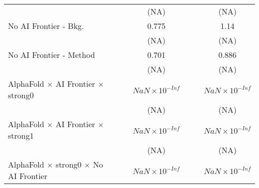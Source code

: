 \begin{tabular}{lcccccc}
                                                                              &                        &                        & (NA)                   &                        &                        & (NA)\\   
   No AI Frontier - Bkg.                                                      &                        &                        & 0.775                  &                        &                        & 1.14\\   
                                                                              &                        &                        & (NA)                   &                        &                        & (NA)\\   
   No AI Frontier - Method                                                    &                        &                        & 0.701                  &                        &                        & 0.886\\   
                                                                              &                        &                        & (NA)                   &                        &                        & (NA)\\   
   AlphaFold $\times$ AI Frontier $\times$ strong0                            &                        &                        & $NaN\times 10^{-Inf}$  &                        &                        & $NaN\times 10^{-Inf}$\\    
                                                                              &                        &                        & (NA)                   &                        &                        & (NA)\\   
   AlphaFold $\times$ AI Frontier $\times$ strong1                            &                        &                        & $NaN\times 10^{-Inf}$  &                        &                        & $NaN\times 10^{-Inf}$\\    
                                                                              &                        &                        & (NA)                   &                        &                        & (NA)\\   
   AlphaFold $\times$ strong0 $\times$ No AI Frontier                         &                        &                        & $NaN\times 10^{-Inf}$  &                        &                        & $NaN\times 10^{-Inf}$\\    

\end{tabular}
